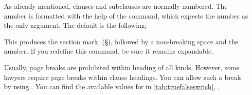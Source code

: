 \begin{Declaration}
\end{Declaration}
As already mentioned, clauses and subclauses are normally numbered. The number
is formatted with the help of the  command, which expects
the number as the only argument. The default is the following:
\begin{lstcode}
  \newcommand*{\Clauseformat}[1]{\S~#1}
\end{lstcode}
This produces the section mark,  (\S), followed by a
non-breaking space and the number. If you redefine this command, be sure it
remains expandable.%
\EndIndexGroup


\begin{Declaration}
\end{Declaration}%
Usually, page breaks are prohibited within heading of all kinds. However, some
lawyers require page breaks within clause headings. You can allow such a break
by using .
You can find the available values for  in
\autoref{tab:truefalseswitch}, .%
\EndIndexGroup
  
